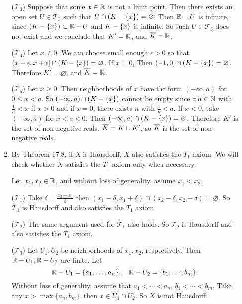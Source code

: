 \documentclass[12pt]{report}
\newcommand{\subprob}[1]{\item[\textbf{\sffamily (#1)}]}
\newcommand{\T}{\mathcal{T}}
\begin{document}
\begin{enumerate}
\begin{enumerate}
        \medskip

        (\(\T_3\)) Suppose that some \(x \in \mathbb{R}\) is not a limit point. Then there exists an open set \(U \in \T_3\) such that \(U \cap \left( K - \{x\} \right) = \varnothing\). Then \(\mathbb{R} - U\) is infinite, since \(\left( K - \{x\} \right) \subset \mathbb{R} - U\) and \(K - \{x\}\) is infinite. So such \(U \in \T_3\) does not exist and we conclude that \(K' = \mathbb{R}\), and \(\overline{K} = \mathbb{R}\).

        \medskip

        (\(\T_4\)) Let \(x \neq 0\). We can choose small enough \(\epsilon > 0\) so that \((x - \epsilon, x + \epsilon] \cap \left( K - \{x\} \right) = \varnothing\). If \(x = 0\), Then \((-1, 0] \cap \left( K - \{x\} \right) = \varnothing\). Therefore \(K' = \varnothing\), and \(\overline{K} = \mathbb{R}\).

        \medskip

        (\(\T_5\)) Let \(x \geq 0\). Then neighborhoods of \(x\) have the form \((-\infty, a)\) for \(0 \leq x < a\). So \((-\infty, a) \cap \left( K - \{x\} \right)\) cannot be empty since \(\exists n \in \N\) with \(\frac{1}{n} < x\) if \(x > 0\) and if \(x = 0\), there exists \(n\) with \(\frac{1}{n} < a\). If \(x < 0\), take \((-\infty, a)\) for \(x < a < 0\). Then \((-\infty, a) \cap \left( K - \{x\} \right) = \varnothing\). Therefore \(K'\) is the set of non-negative reals. \(\overline{K} = K \cup K'\), so \(\overline{K}\) is the set of non-negative reals.

        \subprob{c} By Theorem 17.8, if \(X\) is Hausdorff, \(X\) also satisfies the \(T_1\) axiom. We will check whether \(X\) satisfies the \(T_1\) axiom only when necessary.

        Let \(x_1, x_2 \in \mathbb{R}\), and without loss of generality, assume \(x_1 < x_2\).

        \medskip

        (\(\T_1\)) Take \(\delta = \frac{x_2 - x_1}{3}\) then \((x_1 - \delta, x_1 + \delta) \cap (x_2 - \delta, x_2 + \delta) = \varnothing\). So \(\T_1\) is Hausdorff and also satisfies the \(T_1\) axiom.

        \medskip

        (\(\T_2\)) The same argument used for \(\T_1\) also holds. So \(\T_2\) is Hausdorff and also satisfies the \(T_1\) axiom.

        \medskip

        (\(\T_3\)) Let \(U_1, U_2\) be neighborhoods of \(x_1, x_2\), respectively. Then \(\mathbb{R} - U_1, \mathbb{R} - U_2\) are finite. Let
        \[
            \mathbb{R} - U_1 = \{a_1, \dots, a_n\}, \quad \mathbb{R} - U_2 = \{b_1, \dots, b_m\}.
        \]
        Without loss of generality, assume that \(a_1 < \cdots < a_n\), \(b_1 < \cdots < b_m\). Take any \(x > \max\{a_n, b_m\}\), then \(x \in U_1 \cap U_2\). So \(X\) is not Hausdorff.


\end{enumerate}
\end{enumerate}
\end{document}

